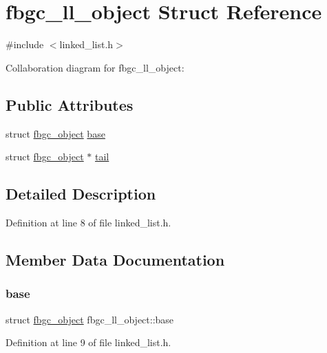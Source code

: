 \hypertarget{structfbgc__ll__object}{}\section{fbgc\+\_\+ll\+\_\+object Struct Reference}
\label{structfbgc__ll__object}


{\ttfamily \#include $<$linked\+\_\+list.\+h$>$}



Collaboration diagram for fbgc\+\_\+ll\+\_\+object\+:
\subsection*{Public Attributes}
\begin{DoxyCompactItemize}
\item 
struct \hyperlink{structfbgc__object}{fbgc\+\_\+object} \hyperlink{structfbgc__ll__object_abc829c865a8f7d6fba61eea308dad38c}{base}
\item 
struct \hyperlink{structfbgc__object}{fbgc\+\_\+object} $\ast$ \hyperlink{structfbgc__ll__object_afa4c109a8bc5b6e544623d01a1ecf0ac}{tail}
\end{DoxyCompactItemize}


\subsection{Detailed Description}


Definition at line 8 of file linked\+\_\+list.\+h.



\subsection{Member Data Documentation}
\mbox{\label{structfbgc__ll__object_abc829c865a8f7d6fba61eea308dad38c}} 
\subsubsection{\texorpdfstring{base}{base}}
{\footnotesize\ttfamily struct \hyperlink{structfbgc__object}{fbgc\+\_\+object} fbgc\+\_\+ll\+\_\+object\+::base}



Definition at line 9 of file linked\+\_\+list.\+h.

